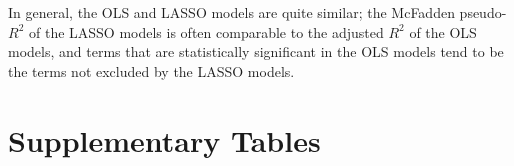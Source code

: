 \documentclass[10pt,landscape]{article}
\begin{document}
In general, the OLS and LASSO models are quite similar; the McFadden pseudo-\(R^2\) of the LASSO models is often comparable to the adjusted \(R^2\) of the OLS models, and terms that are statistically significant in the OLS models tend to be the terms not excluded by the LASSO models. 
\clearpage


\section{Supplementary Tables}


\clearpage


\clearpage


\clearpage


\clearpage


\clearpage


\clearpage


\clearpage


\clearpage


\clearpage


\clearpage


\clearpage


\clearpage


\clearpage


\clearpage


\clearpage


\clearpage


\clearpage


\clearpage


\clearpage


\clearpage


\clearpage


\clearpage


\clearpage

%

%
\end{document}
